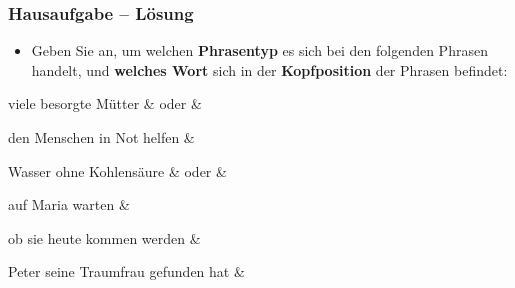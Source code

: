 

\begin{frame}
\frametitle{Hausaufgabe -- Lösung}

\begin{itemize}
	\item Geben Sie an, um welchen \textbf{Phrasentyp} es sich bei den folgenden Phrasen handelt, und \textbf{welches Wort} sich in der \textbf{Kopfposition} der Phrasen befindet:
\end{itemize}	

\eal
	\ex viele besorgte Mütter  \pause \hfill {} \&  oder  \&  \pause 

	\ex den Menschen in Not helfen \pause \hfill {} \&  \pause 
	
	\ex Wasser ohne Kohlensäure \pause \hfill {} \&  oder \alertgreen{$\emptyset$} \&  \pause 
	
	\ex auf Maria warten \pause \hfill {} \&  \pause 
	
	\ex ob sie heute kommen werden \pause \hfill {} \&  \pause 
	
	\ex Peter seine Traumfrau gefunden hat \pause \hfill {} \& 
\zl

\end{frame}


